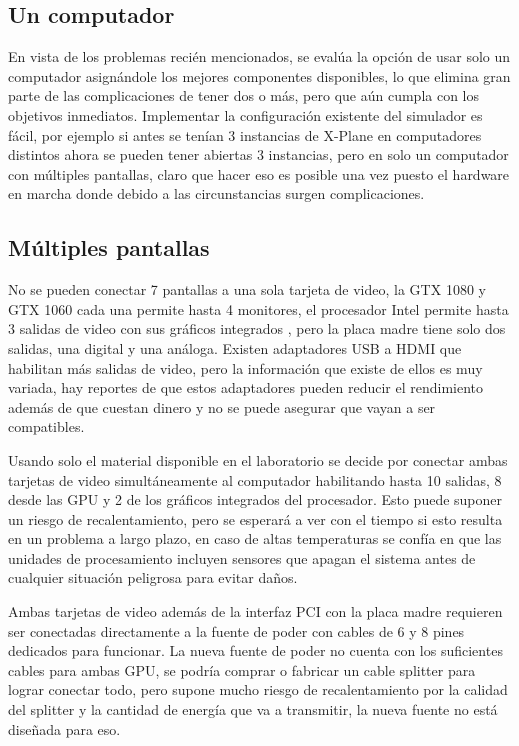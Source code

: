\subsection{Un computador}

En vista de los problemas recién mencionados, se evalúa la opción de usar solo un computador asignándole los mejores componentes disponibles, lo que elimina gran parte de las complicaciones de tener dos o más, pero que aún cumpla con los objetivos inmediatos. Implementar la configuración existente del simulador es fácil, por ejemplo si antes se tenían 3 instancias de X-Plane en computadores distintos ahora se pueden tener abiertas 3 instancias, pero en solo un computador con múltiples pantallas, claro que hacer eso es posible una vez puesto el hardware en marcha donde debido a las circunstancias surgen complicaciones.

\subsection{Múltiples pantallas}

No se pueden conectar 7 pantallas a una sola tarjeta de video, la GTX 1080 y GTX 1060 cada una permite hasta 4 monitores, el procesador Intel permite hasta 3 salidas de video con sus gráficos integrados \cite{i7-3770k}, pero la placa madre tiene solo dos salidas, una digital y una análoga. Existen adaptadores USB a HDMI que habilitan más salidas de video, pero la información que existe de ellos es muy variada, hay reportes de que estos adaptadores pueden reducir el rendimiento además de que cuestan dinero y no se puede asegurar que vayan a ser compatibles.

Usando solo el material disponible en el laboratorio se decide por conectar ambas tarjetas de video simultáneamente al computador habilitando hasta 10 salidas, 8 desde las GPU y 2 de los gráficos integrados del procesador. Esto puede suponer un riesgo de recalentamiento, pero se esperará a ver con el tiempo si esto resulta en un problema a largo plazo, en caso de altas temperaturas se confía en que las unidades de procesamiento incluyen sensores que apagan el sistema antes de cualquier situación peligrosa para evitar daños.

Ambas tarjetas de video además de la interfaz PCI con la placa madre requieren ser conectadas directamente a la fuente de poder con cables de 6 y 8 pines dedicados para funcionar. La nueva fuente de poder no cuenta con los suficientes cables para ambas GPU, se podría comprar o fabricar un cable splitter para lograr conectar todo, pero supone mucho riesgo de recalentamiento por la calidad del splitter y la cantidad de energía que va a transmitir, la nueva fuente no está diseñada para eso.  

